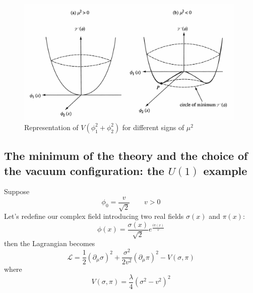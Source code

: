 \documentclass[TheoreticalPhy_ModB.tex]{subfiles}
\begin{document}
\begin{figure}[H]
\centering
\includegraphics[width=11cm]{img/potential-SSB.jpg}
\caption{Representation of $V(\phi_1^2+\phi_2^2)$ for different signs of $\mu^2$}
\label{fig:SSB-potental}
\end{figure}

\subsection{The minimum of the theory and the choice of the vacuum configuration: the $U(1)$ 
example}

Suppose
\[\phi_0=\frac v{\sqrt2}\qquad v>0\]
Let's redefine our complex field introducing two real fields $\sigma(x)$ and $\pi(x)$:
\[\phi(x)=\frac{\sigma(x)}{\sqrt2}e^{\frac{i\pi(x)}v}\]
then the Lagrangian becomes
\[\mathcal L=\frac12(\partial_\mu\sigma)^2+\frac{\sigma^2}{2v^2}(\partial_\mu\pi)^2-V(\sigma,\pi)\]
where
\[V(\sigma,\pi)=\frac\lambda4(\sigma^2-v^2)^2\]
\end{document}
